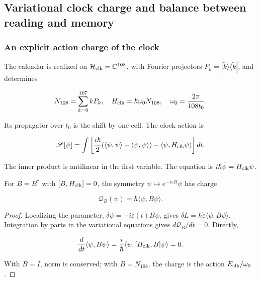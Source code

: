 \subsection{Variational clock charge and balance between reading and memory}

\subsubsection{An explicit action charge of the clock}

The calendar is realized on \(\mathcal H_{\rm clk}=\mathbb C^{108}\), with Fourier projectors \(P_k=|\widetilde k\rangle\langle\widetilde k|\), and determines

\begin{equation}
N_{108}=\sum_{k=0}^{107}kP_k,\quad
H_{\rm clk}=\hbar\omega_0N_{108},\quad
\omega_0=\frac{2\pi}{108t_0}.
\label{nuc07:eq:12}
\end{equation}

Its propagator over \(t_0\) is the shift by one cell. The clock action is

\begin{equation}
\mathscr S[\psi]=\int
\left[\frac{i\hbar}{2}
(\langle\psi,\dot\psi\rangle-\langle\dot\psi,\psi\rangle)
-\langle\psi,H_{\rm clk}\psi\rangle\right]dt.
\label{nuc07:eq:13}
\end{equation}

The inner product is antilinear in the first variable. The equation is \(i\hbar\dot\psi=H_{\rm clk}\psi\).

\begin{proposition}
For \(B=B^*\) with \([B,H_{\rm clk}]=0\), the symmetry \(\psi\mapsto e^{-i\varepsilon B}\psi\) has charge

\begin{equation}
\mathcal Q_B(\psi)=\hbar\langle\psi,B\psi\rangle.
\label{nuc07:eq:14}
\end{equation}
\end{proposition}

\begin{proof}
Localizing the parameter, \(\delta\psi=-i\varepsilon(t)B\psi\), gives \(\delta L=\hbar\dot\varepsilon\langle\psi,B\psi\rangle\). Integration by parts in the variational equations gives \(d\mathcal Q_B/dt=0\). Directly,

\[
\frac{d}{dt}\langle\psi,B\psi\rangle
=\frac{i}{\hbar}\langle\psi,[H_{\rm clk},B]\psi\rangle=0.
\]

With \(B=I\), norm is conserved; with \(B=N_{108}\), the charge is the action \(E_{\rm clk}/\omega_0\).
\end{proof}

